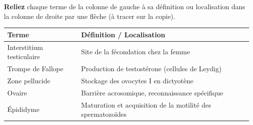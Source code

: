 \documentclass[11pt]{article}
\begin{document}
\begin{exercice}
\textbf{Reliez} chaque terme de la colonne de gauche à sa définition ou localisation dans la colonne de droite par une flèche (à tracer sur la copie).

\begin{tabular}{ll}
\textbf{Terme} & \textbf{Définition / Localisation} \\
\hline
Interstitium testiculaire & Site de la fécondation chez la femme \\
Trompe de Fallope & Production de testostérone (cellules de Leydig) \\
Zone pellucide & Stockage des ovocytes I en dictyotène \\
Ovaire & Barrière acrosomique, reconnaissance spécifique \\
Épididyme & Maturation et acquisition de la motilité des spermatozoïdes \\
\end{tabular}
\end{exercice}
\end{document}
